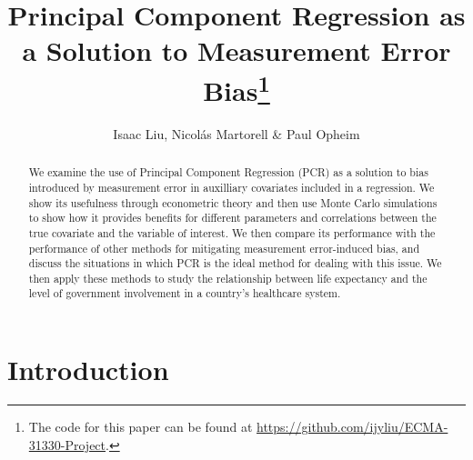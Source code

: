 \documentclass[10pt]{article}
\begin{document}
    \thispagestyle{firststyle}

    \title{Principal Component Regression as a Solution to Measurement Error Bias\thanks{The code for this paper can be found at \url{https://github.com/ijyliu/ECMA-31330-Project}.}} 
    \author{Isaac Liu, Nicol\'as Martorell \& Paul Opheim}
    \maketitle



    \begin{abstract}

        We examine the use of Principal Component Regression (PCR) as a solution to bias introduced by measurement error in auxilliary covariates included in a regression. We show its usefulness through econometric theory and then use Monte Carlo simulations to show how it provides benefits for different parameters and correlations between the true covariate and the variable of interest. We then compare its performance with the performance of other methods for mitigating measurement error-induced bias, and discuss the situations in which PCR is the ideal method for dealing with this issue. We then apply these methods to study the relationship between life expectancy and the level of government involvement in a country's healthcare system.
        
    \end{abstract}

    \newpage \clearpage

    \section*{Introduction}
\end{document}
